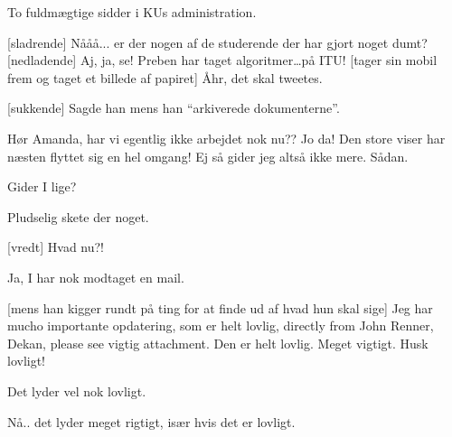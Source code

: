 \documentclass[a4paper,11pt]{article}
\begin{document}
\begin{sketch}



 To fuldmægtige sidder i KUs administration.

[sladrende] Nååå... er der nogen af de studerende der har gjort noget dumt?
[nedladende] Aj, ja, se!  Preben har taget algoritmer\ldots på ITU!
[tager sin mobil frem og taget et billede af papiret] Åhr, det skal tweetes.

[sukkende] Sagde han mens han ``arkiverede dokumenterne''.


 Hør Amanda, har vi egentlig ikke arbejdet nok nu??
 Jo da!  Den store viser har næsten flyttet sig en hel omgang!
 Ej så gider jeg altså ikke mere.  Sådan.



 Gider I lige?


 Pludselig skete der noget.

[vredt] Hvad nu?!

 Ja, I har nok modtaget en mail.


[mens han kigger rundt på ting for at finde ud af hvad hun skal sige] Jeg har mucho importante opdatering, som er helt lovlig, directly from John Renner, Dekan, please see vigtig attachment.  Den er helt lovlig.  Meget vigtigt.  Husk lovligt!

 Det lyder vel nok lovligt.

 Nå.. det lyder meget rigtigt, især hvis det er lovligt. 


\end{sketch}
\end{document}
